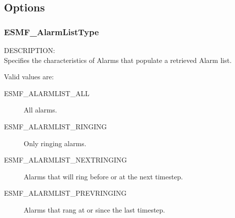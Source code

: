 
\subsection{Options}

\subsubsection{ESMF\_AlarmListType}

{\sf DESCRIPTION:\\}
Specifies the characteristics of Alarms that populate
a retrieved Alarm list.

Valid values are:
\begin{description}

\item [ESMF\_ALARMLIST\_ALL] 
      All alarms.

\item [ESMF\_ALARMLIST\_RINGING] 
      Only ringing alarms.

\item [ESMF\_ALARMLIST\_NEXTRINGING] 
      Alarms that will ring before or at the next timestep.

\item [ESMF\_ALARMLIST\_PREVRINGING] 
      Alarms that rang at or since the last timestep.

\end{description}

